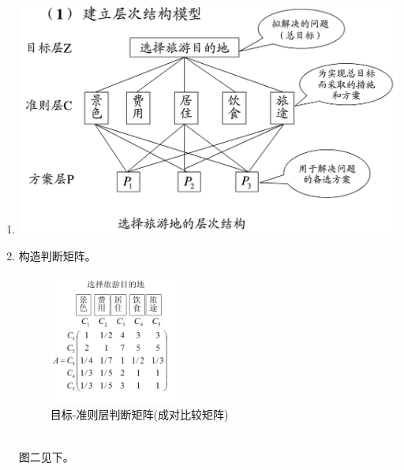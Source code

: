 \documentclass[12pt,a4paper]{article}
\begin{document}
\begin{enumerate}
  \item 
  \begin{center}
    \includegraphics[width = \textwidth]{figures/structure.png}
  \end{center}
  \item 构造判断矩阵。
  \begin{figure}[!htbp]
    \centering
    \includegraphics[width = 0.4\textwidth]{figures/target_criteria.png}
    \caption{目标-准则层判断矩阵(成对比较矩阵)}
  \end{figure}
  \\
  图二见下。
  \begin{figure}[!h]
    \centering
    \subfigure[方案-费用判断矩阵]{
}
\end{figure}
\end{enumerate}
\end{document}
